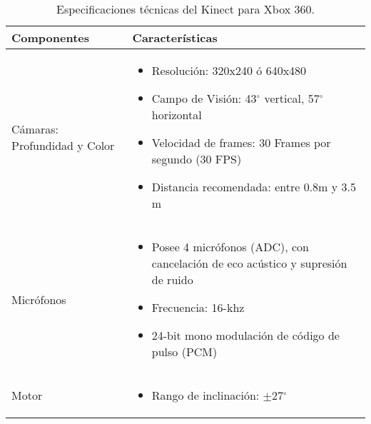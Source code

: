 \documentclass[a4paper,openright,12pt]{report}
\begin{document}
\begin{table}[H]
	\centering
	\begin{tabular}{>{\centering\arraybackslash}m{6cm} >{\arraybackslash}m{7cm} }
		\hline
		Componentes & Características\\
		\hline \hline
		Cámaras: Profundidad y Color
		&
\begin{itemize}
	\item Resolución: 320x240 ó 640x480
	\item Campo de Visión: 43$^{\circ}$ vertical, 57$^{\circ}$ horizontal
	\item Velocidad de frames: 30 Frames por segundo (30 FPS)
	\item Distancia recomendada: entre 0.8m y 3.5 m
\end{itemize}	
		\\
		\hline
		Micrófonos & 
		\begin{itemize}
			\item Posee 4 micrófonos (ADC), con cancelación de eco acústico y supresión de ruido
			\item Frecuencia: 16-khz
			\item 24-bit mono modulación de código de pulso (PCM)
		\end{itemize}
		 \\
		\hline
		Motor &
		\begin{itemize}
			\item  Rango de inclinación: $ \pm $27$^{\circ}$ 
		\end{itemize}\\
		\hline
	\end{tabular}
	\caption{Especificaciones técnicas del Kinect para Xbox 360.}
	\label{tabla:especKinect}
\end{table}
\end{document}
